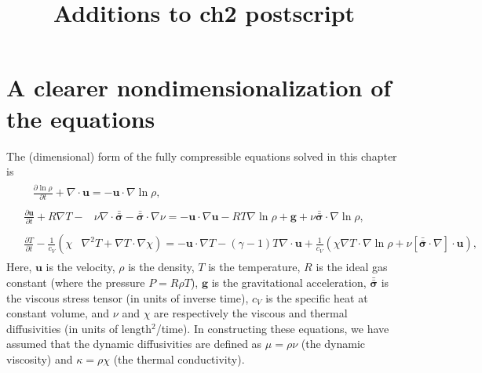 \documentclass[aps, pre, onecolumn, nofootinbib, notitlepage, groupedaddress, amsfonts, amssymb, amsmath, longbibliography, superscriptaddress]{revtex4-1}
\newcommand{\grad}{\ensuremath{\nabla}}
\newcommand{\lilstressT}{\ensuremath{\bm{\bar{\bar{\sigma}}}}}
\begin{document}

\title{Additions to ch2 postscript}

\maketitle


\section{A clearer nondimensionalization of the equations}
\label{sec:introduction}
The (dimensional) form of the fully compressible equations solved in this chapter is
\begin{align}
&\begin{aligned}
&\frac{\partial \ln\rho}{\partial t} + \grad\cdot\bm{u} 
    = -\bm{u}\cdot\grad\ln\rho,
	\label{eqn:ab17continuity_eqn}
\end{aligned}\\
&\begin{aligned}
\frac{\partial\bm{u}}{\partial t} + R \grad T - 
&\nu\grad\cdot\lilstressT - \lilstressT\cdot\grad\nu =
-\bm{u}\cdot\grad\bm{u} - RT\grad\ln\rho + \bm{g} + 
\nu\lilstressT\cdot\grad\ln\rho,
\label{eqn:ab17momentum_eqn}
\end{aligned}\\
&\begin{aligned}
\frac{\partial T}{\partial t} -\frac{1}{c_V}\left(\right.\chi&\left.
    \grad^2 T + \grad T\cdot\grad\chi\right) =
	-\bm{u}\cdot\grad T - (\gamma-1)T\grad\cdot{\bm{u}}
	+ \frac{1}{c_V}\left(\chi\grad T \cdot\grad\ln\rho +
	\nu\left[\lilstressT\cdot\nabla\right]\cdot\bm{u}\right), 
	\label{eqn:ab17energy_eqn}
\end{aligned}
\end{align}
Here, $\bm{u}$ is the velocity, $\rho$ is the density, $T$ is the temperature, $R$ is the ideal gas constant (where the pressure $P = R\rho T$), $\bm{g}$ is the gravitational acceleration, $\lilstressT$ is the viscous stress tensor (in units of inverse time), $c_V$ is the specific heat at constant volume, and $\nu$ and $\chi$ are respectively the viscous and thermal diffusivities (in units of length$^2$/time).
In constructing these equations, we have assumed that the dynamic diffusivities are defined as $\mu = \rho \nu$ (the dynamic viscosity) and $\kappa = \rho \chi$ (the thermal conductivity).
\end{document}
